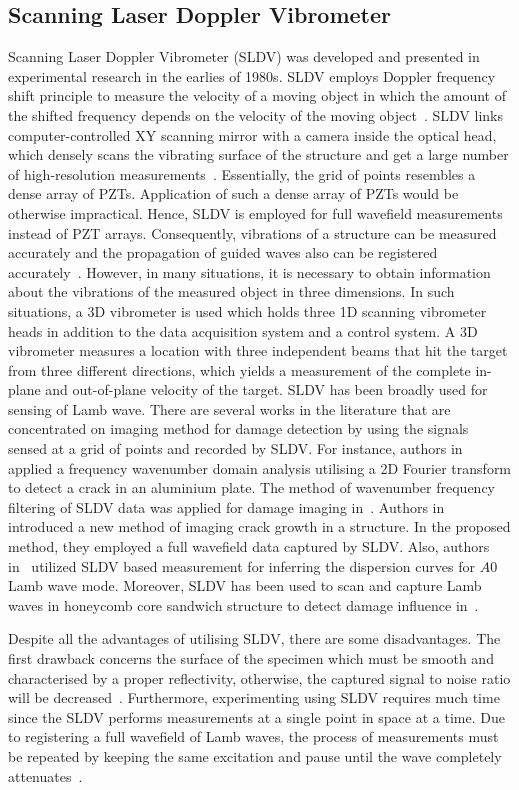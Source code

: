 \subsection{Scanning Laser Doppler Vibrometer} 
Scanning Laser Doppler Vibrometer (SLDV) was developed and presented in experimental research in the earlies of 1980s. 
SLDV employs Doppler frequency shift principle to measure the velocity of a moving object in which the amount of the shifted frequency depends on the velocity of the moving object~\cite{Stanbridge1999}. 
SLDV links computer-controlled XY scanning mirror with a camera inside the optical head, which densely scans the vibrating surface of the structure and get a large number of high-resolution measurements~\cite{Helfrick2011}. 
Essentially, the grid of points resembles a dense array of PZTs. 
Application of such a dense array of PZTs would be otherwise impractical.  
Hence, SLDV is employed for full wavefield measurements instead of PZT arrays. 
Consequently, vibrations of a structure can be measured accurately and the propagation of guided waves also can be registered accurately~\cite{Ostachowicz2014}.
However, in many situations, it is necessary to obtain information about the vibrations of the measured object in three dimensions. 
In such situations, a 3D vibrometer is used which holds three 1D scanning vibrometer heads in addition to the data acquisition system and a control system.
A 3D vibrometer measures a location with three independent beams that hit the target from three different directions, which yields a measurement of the complete in-plane and out-of-plane velocity of the target.
SLDV has been broadly used for sensing of Lamb wave. 
There are several works in the literature that are concentrated on imaging method for damage detection by using the signals sensed at a grid of points and recorded by SLDV.
For instance, authors in~\cite{Yu2013} applied a frequency wavenumber domain analysis utilising a 2D Fourier transform to detect a crack in an aluminium plate. 
The method of wavenumber frequency filtering of SLDV data was applied for damage imaging in~\cite{Ruzzene2007}. 
Authors in~\cite{Kudela2015} introduced a new method of imaging crack growth in a structure.
In the proposed method, they employed a full wavefield data captured by SLDV.
Also, authors in~\cite{Harb2015} utilized SLDV based measurement for inferring  the dispersion curves for \(A0\) Lamb wave mode. 
Moreover, SLDV has been used to scan and capture Lamb waves in honeycomb core sandwich structure to detect damage influence in~\cite{Lamboul2013}.

Despite all the advantages of utilising SLDV, there are some disadvantages. 
The first drawback concerns the surface of the specimen which must be smooth and characterised by a proper reflectivity, otherwise, the captured signal to noise ratio will be decreased~\cite{Ostachowicz2014}. 
Furthermore, experimenting using  SLDV requires much time since the SLDV performs measurements at a single point in space at a time.
Due to registering a full wavefield of Lamb waves, the process of measurements must be repeated by keeping the same excitation and pause until the wave completely attenuates~\cite{Ostachowicz2014}.